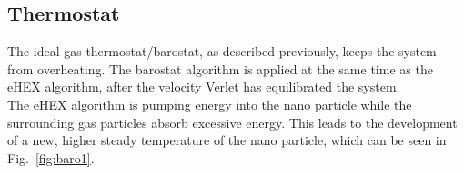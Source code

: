 \documentclass[12pt]{article}
\begin{document}
\subsection{Thermostat}
The ideal gas thermostat/barostat, as described previously, 
keeps the system from overheating. The barostat algorithm is applied at the same time as the eHEX algorithm,
after the velocity Verlet has equilibrated the system.\\
The eHEX algorithm is pumping energy into the nano particle while the surrounding gas particles absorb excessive energy. This leads to the
development of a new, higher steady temperature of the nano particle, which can be seen in Fig.~\ref{fig:baro1}. 
\end{document}
